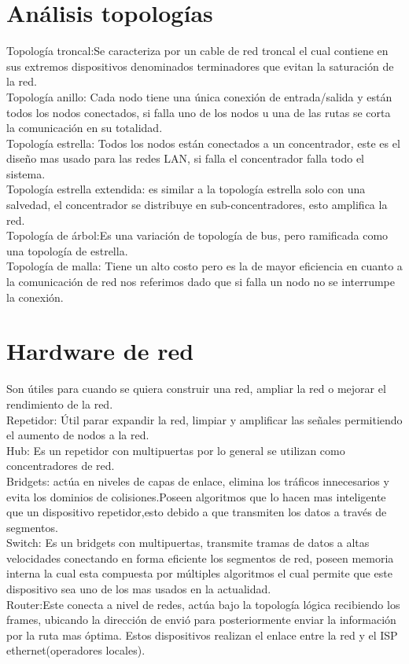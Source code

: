\documentclass[spanish]{udpreport}
\begin{document}
\section{Análisis topologías}
Topología troncal:Se caracteriza por un cable de red troncal el cual contiene en sus extremos dispositivos denominados terminadores que evitan la saturación de la red.
\\[0.2cm]
Topología anillo: Cada nodo tiene una única conexión de entrada/salida y están todos los nodos conectados, si falla uno de los nodos u una de las rutas se corta la comunicación en su totalidad.
\\[0.2cm]
Topología estrella: Todos los nodos están conectados a un concentrador, este es el diseño mas usado para las redes LAN, si falla el concentrador falla todo el sistema.
\\[0.2cm]
Topología estrella extendida: es similar a la topología estrella solo con una salvedad, el concentrador se distribuye en sub-concentradores, esto amplifica la red.
\\[0.2cm]
Topología de árbol:Es una variación de topología de bus, pero ramificada como una topología de estrella.
\\[0.2cm]
Topología de malla: Tiene un alto costo pero es la de mayor eficiencia en cuanto a la comunicación de red nos referimos dado que si falla un nodo no se interrumpe la conexión.
\\
\section{Hardware de red}
Son útiles para cuando se quiera construir una red, ampliar la red o mejorar el rendimiento de la red.
\\[0.2cm]
Repetidor: Útil parar expandir la red, limpiar y amplificar las señales permitiendo el aumento de nodos a la red.
\\[0.2cm]
Hub: Es un repetidor con multipuertas por lo general se utilizan como concentradores de red.
\\[0.2cm]
Bridgets: actúa en niveles de capas de enlace, elimina los tráficos innecesarios y evita los dominios de colisiones.Poseen algoritmos que lo hacen mas inteligente que un dispositivo repetidor,esto debido a que transmiten los datos a través de segmentos.
\\[0.2cm]
Switch: Es un bridgets con multipuertas, transmite tramas de datos a altas velocidades conectando en forma eficiente los segmentos de red, poseen memoria interna la cual esta compuesta por múltiples algoritmos el cual permite que este dispositivo sea uno de los mas usados en la actualidad.
\\[0.2cm]
Router:Este conecta a nivel de redes, actúa bajo la topología lógica recibiendo los frames, ubicando la dirección de envió para posteriormente enviar la información por la ruta mas óptima. Estos dispositivos realizan el enlace entre la red y el ISP ethernet(operadores locales).
\end{document}
